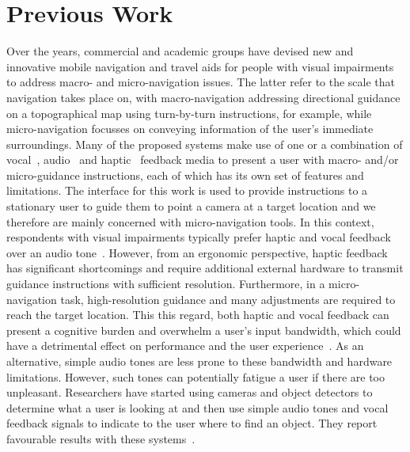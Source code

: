 \documentclass[acmsmall]{acmart}
\begin{document}
\section{Previous Work}\label{sec:prev-work}

Over the years, commercial and academic groups have devised new and innovative mobile navigation and travel aids for people with visual impairments to address macro- and micro-navigation issues.
The latter refer to the scale that navigation takes place on, with macro-navigation addressing directional guidance on a topographical map using turn-by-turn instructions, for example, while micro-navigation focusses on conveying information of the user's immediate surroundings. 
Many of the proposed systems make use of one or a combination of vocal~\citep{mocanu2016when,chessa2016integrated,kanwal2015navigation,sato2019navcog}, audio~\citep{schwarze2015intuitive,rodriguez2012obstacle,kammoun2012navigation} and haptic~\citep{rivera-rubio2015assistive,lee2015rgb,xiao2015assistive} feedback media to present a user with macro- and/or micro-guidance instructions, each of which has its own set of features and limitations.
The interface for this work is used to provide instructions to a stationary user to guide them to point a camera at a target location and we therefore are mainly concerned with micro-navigation tools. 
In this context, respondents with visual impairments typically prefer haptic and vocal feedback over an audio tone~\citep{arditi2013user,golledge2004stated}.
However, from an ergonomic perspective, haptic feedback has significant shortcomings and require additional external hardware to transmit guidance instructions with sufficient resolution.
Furthermore, in a micro-navigation task, high-resolution guidance and many adjustments are required to reach the target location.
This this regard, both haptic and vocal feedback can present a cognitive burden and overwhelm a user's input bandwidth, which could have a detrimental effect on performance and the user experience~\citep{klatzky2006cognitive}.
As an alternative, simple audio tones are less prone to these bandwidth and hardware limitations.
However, such tones can potentially fatigue a user if there are too unpleasant.
Researchers have started using cameras and object detectors to determine what a user is looking at and then use simple audio tones and vocal feedback signals to indicate to the user where to find an object.
They report favourable results with these systems~\citep{schauerte2012assistive,tian2013computer,fiannaca2014headlock,vazquez2012helping}.
\end{document}
